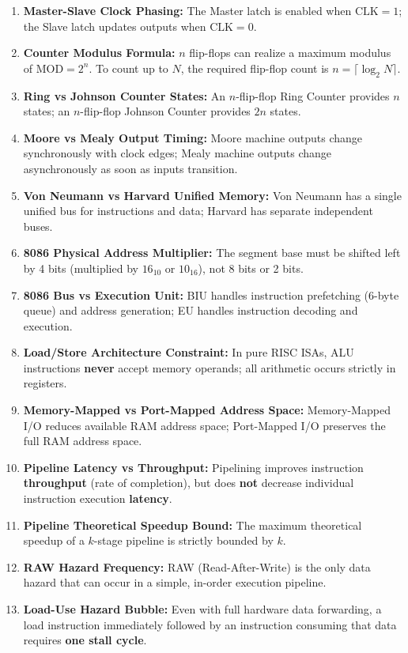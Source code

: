 \begin{enumerate}[label=\bfseries\arabic*.]
    \item \textbf{Master-Slave Clock Phasing:} The Master latch is enabled when $\text{CLK}=1$; the Slave latch updates outputs when $\text{CLK}=0$.
    \item \textbf{Counter Modulus Formula:} $n$ flip-flops can realize a maximum modulus of $\text{MOD} = 2^n$. To count up to $N$, the required flip-flop count is $n = \lceil \log_2 N \rceil$.
    \item \textbf{Ring vs Johnson Counter States:} An $n$-flip-flop Ring Counter provides $n$ states; an $n$-flip-flop Johnson Counter provides $2n$ states.
    \item \textbf{Moore vs Mealy Output Timing:} Moore machine outputs change synchronously with clock edges; Mealy machine outputs change asynchronously as soon as inputs transition.
    \item \textbf{Von Neumann vs Harvard Unified Memory:} Von Neumann has a single unified bus for instructions and data; Harvard has separate independent buses.
    \item \textbf{8086 Physical Address Multiplier:} The segment base must be shifted left by 4 bits (multiplied by $16_{10}$ or $10_{16}$), not 8 bits or 2 bits.
    \item \textbf{8086 Bus vs Execution Unit:} BIU handles instruction prefetching (6-byte queue) and address generation; EU handles instruction decoding and execution.
    \item \textbf{Load/Store Architecture Constraint:} In pure RISC ISAs, ALU instructions \textbf{never} accept memory operands; all arithmetic occurs strictly in registers.
    \item \textbf{Memory-Mapped vs Port-Mapped Address Space:} Memory-Mapped I/O reduces available RAM address space; Port-Mapped I/O preserves the full RAM address space.
    \item \textbf{Pipeline Latency vs Throughput:} Pipelining improves instruction \textbf{throughput} (rate of completion), but does \textbf{not} decrease individual instruction execution \textbf{latency}.
    \item \textbf{Pipeline Theoretical Speedup Bound:} The maximum theoretical speedup of a $k$-stage pipeline is strictly bounded by $k$.
    \item \textbf{RAW Hazard Frequency:} RAW (Read-After-Write) is the only data hazard that can occur in a simple, in-order execution pipeline.
    \item \textbf{Load-Use Hazard Bubble:} Even with full hardware data forwarding, a load instruction immediately followed by an instruction consuming that data requires \textbf{one stall cycle}.

\end{enumerate}
